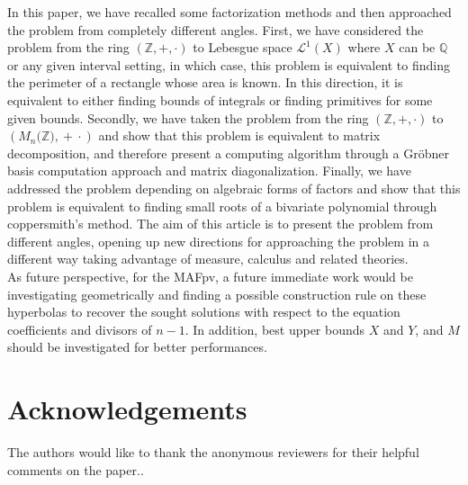 \documentclass[sigconf,balance=false]{acmart}
\begin{document}
In this paper, we have recalled some factorization methods and then approached the problem from completely different angles. First, we have considered the problem from the ring $\displaystyle\left(\mathbb{Z}, \text{+}, \cdot\right)$ to Lebesgue space $\mathcal{L}^{1}\left(X\right)$ where $X$ can be $\mathbb{Q}$ or any given interval setting, in which case, this problem is equivalent to finding the perimeter of a rectangle whose area is known. In this direction, it is equivalent to either finding bounds of integrals or finding primitives for some given bounds. 
Secondly, we have taken the problem from the ring $\displaystyle\left(\mathbb{Z}, \text{+}, \cdot\right) $ to $\left( M_{n}\text{(}\mathbb{Z}\text{)}, \ \text{+} \ \cdot\right)$ and show that this problem is equivalent to matrix decomposition, and therefore present a computing algorithm through a Gröbner basis computation approach and matrix diagonalization.
Finally, we have addressed the problem depending on algebraic forms of factors and show that this problem is equivalent to finding small roots of a bivariate polynomial through coppersmith's method.
The aim of this article is to present the problem from different angles, opening up new directions for approaching the problem in a different way taking advantage of measure, calculus and related theories.\\
As future perspective, for the MAFpv, a future immediate work would be investigating geometrically and finding a possible construction rule on these hyperbolas to recover the sought solutions with respect to the equation coefficients and divisors of $n-1$. In addition, best upper bounds $X$ and $Y$, and $M$ should be investigated for better performances. 
\section{Acknowledgements}
The authors would like to thank the anonymous reviewers for their helpful comments on the paper.. \\ \\
\end{document}
